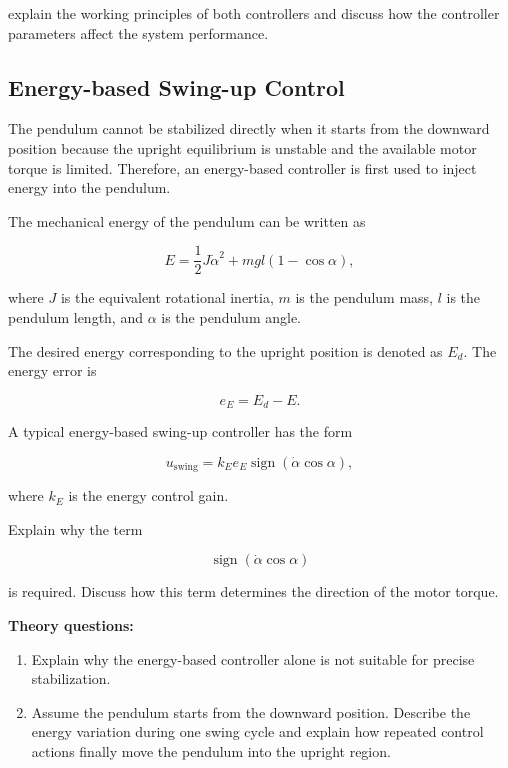 \documentclass[11pt,a4paper]{article}
\begin{document}
 explain the working principles of both controllers and discuss
how the controller parameters affect the system performance.


\subsection{Energy-based Swing-up Control}

The pendulum cannot be stabilized directly when it starts from the downward
position because the upright equilibrium is unstable and the available motor
torque is limited. Therefore, an energy-based controller is first used to
inject energy into the pendulum.

The mechanical energy of the pendulum can be written as

\[
E =
\frac{1}{2}J\dot{\alpha}^{2}
+
mgl(1-\cos\alpha),
\]

where $J$ is the equivalent rotational inertia, $m$ is the pendulum mass,
$l$ is the pendulum length, and $\alpha$ is the pendulum angle.

The desired energy corresponding to the upright position is denoted as
$E_d$. The energy error is

\[
e_E=E_d-E .
\]

A typical energy-based swing-up controller has the form

\[
u_{\mathrm{swing}}
=
k_E e_E
\operatorname{sign}(\dot{\alpha}\cos\alpha),
\]

where $k_E$ is the energy control gain.

Explain why the term

\[
\operatorname{sign}(\dot{\alpha}\cos\alpha)
\]

is required. Discuss how this term determines the direction of the motor
torque.

\vspace{0.2cm}

\textbf{Theory questions:}

\begin{enumerate}[label=(\alph*),leftmargin=0.8cm]



\item Explain why the energy-based
controller alone is not suitable for precise stabilization.

\item Assume the pendulum starts from the downward position. Describe the
energy variation during one swing cycle and explain how repeated control
actions finally move the pendulum into the upright region.

\end{enumerate}
\end{document}
